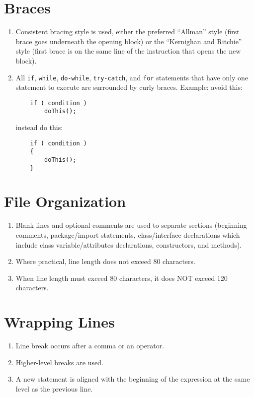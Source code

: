 \section*{Braces}\begin{enumerate}[resume]
\item Consistent bracing style is used, either the preferred ``Allman'' style (first brace goes underneath the opening block) or the ``Kernighan and Ritchie'' style (first brace is on the same line of the instruction that opens the new block).
\item All \texttt{if}, \texttt{while}, \texttt{do-while}, \texttt{try-catch}, and \texttt{for} statements that have only one statement to execute are surrounded by curly braces. Example:
avoid this:


\begin{verbatim}
    if ( condition )
        doThis();
\end{verbatim}

instead do this:

\begin{verbatim}
    if ( condition )
    {
        doThis();
    }
\end{verbatim}

\end{enumerate}

\section*{File Organization}\begin{enumerate}[resume]
\item Blank lines and optional comments are used to separate sections (beginning comments, package/import statements, class/interface declarations which include class variable/attributes declarations, constructors, and methods).
\item Where practical, line length does not exceed 80 characters.
\item When line length must exceed 80 characters, it does NOT exceed 120 characters.
\end{enumerate}

\section*{Wrapping Lines}\begin{enumerate}[resume]
\item Line break occurs after a comma or an operator.
\item Higher-level breaks are used.
\item A new statement is aligned with the beginning of the expression at the same level as the previous line.
\end{enumerate}

